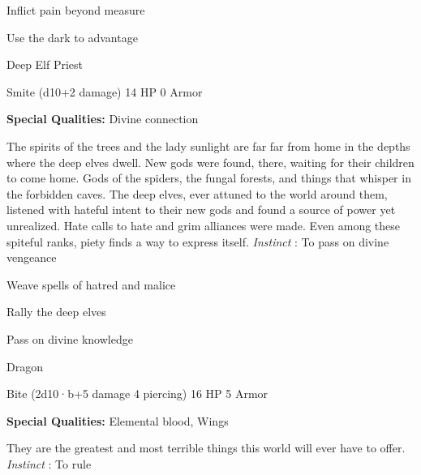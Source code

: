 \startitemize[1,packed]

\item Inflict pain beyond measure

 
\item Use the dark to advantage


\stopitemize
 
\startMonsterName
Deep Elf Priest	 
\stopMonsterName
 

Smite (d10+2 damage)	14 HP	0 Armor

 


 
\startMonsterQualities
{\bf Special Qualities:}  Divine connection
\stopMonsterQualities
 
\startMonsterDescription
The spirits of the trees and the lady sunlight are far far from home in the depths where the deep elves dwell. New gods were found, there, waiting for their children to come home. Gods of the spiders, the fungal forests, and things that whisper in the forbidden caves. The deep elves, ever attuned to the world around them, listened with hateful intent to their new gods and found a source of power yet unrealized. Hate calls to hate and grim alliances were made. Even among these spiteful ranks, piety finds a way to express itself. {\em Instinct} : To pass on divine vengeance
\stopMonsterDescription
 
\startitemize[1,packed]

\item Weave spells of hatred and malice

 
\item Rally the deep elves

 
\item Pass on divine knowledge


\stopitemize
 
\startMonsterName
Dragon	 
\stopMonsterName
 

Bite (2d10·b+5 damage 4 piercing)	16 HP	5 Armor

 


 
\startMonsterQualities
{\bf Special Qualities:}  Elemental blood, Wings
\stopMonsterQualities
 
\startMonsterDescription
They are the greatest and most terrible things this world will ever have to offer. {\em Instinct} : To rule
\stopMonsterDescription
 
